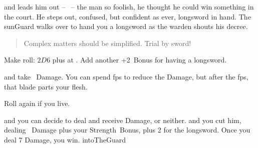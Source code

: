 and  leads him out -- \composeHumanName\ -- the man so foolish, he thought he could win something in the \gls{court}.
He steps out, confused, but confident as ever, longsword in hand.
The \gls{sunGuard} walks over to hand you a longsword as the \gls{warden} shouts his decree.

\begin{quotation}
  Complex matters should be simplified.
  Trial by sword!
\end{quotation}

Make  roll: $2D6$ plus  at \tn[11].
Add another +2~Bonus for having a longsword.

\begin{selectPath}
  {and take ~Damage.
  You can spend \glspl{fp} to reduce the Damage, but after the \glspl{fp}, that blade parts your flesh.

  Roll again if you live.}%
  {}
  {and you can decide to deal and receive Damage, or neither.}%
  {}
  {and you cut him, dealing ~Damage plus your Strength~Bonus, plus 2 for the longsword.
  Once you deal 7 Damage, you win.}%
  {intoTheGuard}
\end{selectPath}

